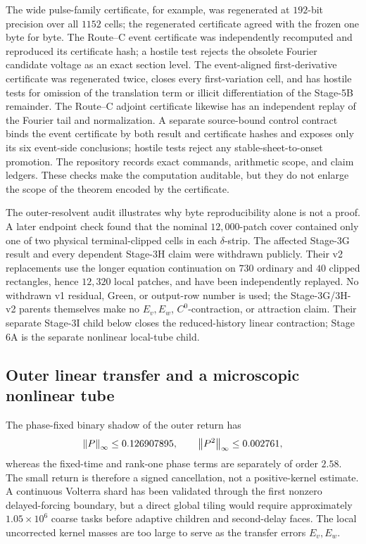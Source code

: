 The wide pulse-family certificate, for example, was regenerated at
\(192\)-bit precision over all \(1152\) cells; the regenerated certificate
agreed with the frozen one byte for byte.  The Route--C event certificate
was independently recomputed and reproduced its certificate hash; a hostile
test rejects the obsolete Fourier candidate voltage as an exact section
level.  The event-aligned first-derivative certificate was regenerated twice,
closes every first-variation cell, and has hostile tests for omission of the
translation term or illicit differentiation of the Stage-5B remainder.  The
Route--C adjoint certificate likewise has an independent replay of the
Fourier tail and normalization.  A separate source-bound control
contract binds the event certificate by both result and certificate hashes
and exposes only its six event-side conclusions; hostile tests reject any
stable-sheet-to-onset promotion.  The repository records exact commands,
arithmetic scope, and claim ledgers.  These checks make the computation
auditable, but they do not enlarge the scope of the theorem encoded by the
certificate.

The outer-resolvent audit illustrates why byte reproducibility alone is not
a proof.  A later endpoint check found that the nominal \(12{,}000\)-patch
cover contained only one of two physical terminal-clipped cells in each
\(\delta\)-strip.  The affected Stage-3G result and every dependent
Stage-3H claim were withdrawn publicly.  Their v2 replacements use the
longer equation continuation on \(730\) ordinary and \(40\) clipped
rectangles, hence \(12{,}320\) local patches, and have been independently
replayed.  No withdrawn v1 residual, Green, or output-row number is used;
the Stage-3G/3H-v2 parents themselves make no \(E_v,E_w\),
\(C^0\)-contraction, or attraction claim.  Their separate Stage-3I child
below closes the reduced-history linear contraction; Stage 6A is the
separate nonlinear local-tube child.

\subsection{Outer linear transfer and a microscopic nonlinear tube}

The phase-fixed binary shadow of the outer return has
\[
 \left\lVert P\right\rVert_{\infty}\le0.126907895,\qquad
 \left\lVert P^2\right\rVert_{\infty}\le0.002761,
\]
whereas the fixed-time and rank-one phase terms are separately of order
\(2.58\).  The small return is therefore a signed cancellation, not a
positive-kernel estimate.  A continuous Volterra shard has been validated
through the first nonzero delayed-forcing boundary, but a direct global
tiling would require approximately \(1.05\times10^6\) coarse tasks before
adaptive children and second-delay faces.  The local uncorrected kernel
masses are too large to serve as the transfer errors \(E_v,E_w\).

